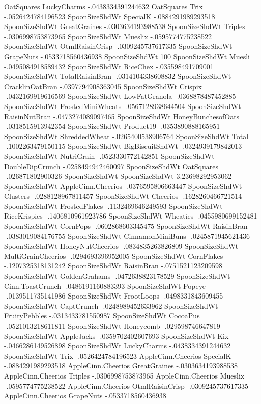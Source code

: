 OatSquares	LuckyCharms	-.0438334391244632
OatSquares	Trix	-.0526424784196523
SpoonSizeShdWt	SpecialK	-.0884291989293518
SpoonSizeShdWt	GreatGraines	-.0303634193988538
SpoonSizeShdWt	Triples	-.0306998753873965
SpoonSizeShdWt	Mueslix	-.0595774775238522
SpoonSizeShdWt	OtmlRaisinCrisp	-.0309245737617335
SpoonSizeShdWt	GrapeNuts	-.0533718560436938
SpoonSizeShdWt	100%
SpoonSizeShdWt	Muesli	-.0495084918589432
SpoonSizeShdWt	RiceChex	-.035598491709001
SpoonSizeShdWt	TotalRaisinBran	-.0314104338608832
SpoonSizeShdWt	CracklinOatBran	-.0397794908363045
SpoonSizeShdWt	Crispix	-.0432169919616569
SpoonSizeShdWt	LowFatGranola	-.0368878487452885
SpoonSizeShdWt	FrostedMiniWheats	-.0567128938644504
SpoonSizeShdWt	RaisinNutBran	-.0473274089097465
SpoonSizeShdWt	HoneyBunchesofOats	-.0318515913942354
SpoonSizeShdWt	Product19	-.0353890888165951
SpoonSizeShdWt	ShreddedWheat	-.0265400538906764
SpoonSizeShdWt	Total	-.1002263479150115
SpoonSizeShdWt	BigBiscuitShdWt	-.0324939179842013
SpoonSizeShdWt	NutriGrain	-.0523330772142851
SpoonSizeShdWt	DoubleDipCrunch	-.0258494942460097
SpoonSizeShdWt	OatSquares	-.026871802900326
SpoonSizeShdWt	SpoonSizeShdWt	3.23698292953062
SpoonSizeShdWt	AppleCinn.Cheerios	-.0376595806663447
SpoonSizeShdWt	Clusters	-.0288128967811457
SpoonSizeShdWt	Cheerios	-.1628260466721514
SpoonSizeShdWt	FrostedFlakes	-.1132469646249593
SpoonSizeShdWt	RiceKrispies	-.1406810961923786
SpoonSizeShdWt	Wheaties	-.0455980699152481
SpoonSizeShdWt	CornPops	-.0602868603345475
SpoonSizeShdWt	RaisinBran	-.0383019084176755
SpoonSizeShdWt	CinnamonMiniBuns	-.0245871945621436
SpoonSizeShdWt	HoneyNutCheerios	-.0834835263826809
SpoonSizeShdWt	MultiGrainCheerios	-.0294693396952005
SpoonSizeShdWt	CornFlakes	-.1207325318131242
SpoonSizeShdWt	RaisinBran	-.0751521123209598
SpoonSizeShdWt	GoldenGrahams	-.0472638823178529
SpoonSizeShdWt	Cinn.ToastCrunch	-.0486191160883393
SpoonSizeShdWt	Popeye	-.0139511735141986
SpoonSizeShdWt	FrootLoops	-.0498331843609455
SpoonSizeShdWt	CaptCrunch	-.0248989452633962
SpoonSizeShdWt	FruityPebbles	-.0313433781550987
SpoonSizeShdWt	CocoaPus	-.0521013218611811
SpoonSizeShdWt	Honeycomb	-.029598746647819
SpoonSizeShdWt	AppleJacks	-.0359702402607693
SpoonSizeShdWt	Kix	-.0466286149526898
SpoonSizeShdWt	LuckyCharms	-.0438334391244632
SpoonSizeShdWt	Trix	-.0526424784196523
AppleCinn.Cheerios	SpecialK	-.0884291989293518
AppleCinn.Cheerios	GreatGraines	-.0303634193988538
AppleCinn.Cheerios	Triples	-.0306998753873965
AppleCinn.Cheerios	Mueslix	-.0595774775238522
AppleCinn.Cheerios	OtmlRaisinCrisp	-.0309245737617335
AppleCinn.Cheerios	GrapeNuts	-.0533718560436938
